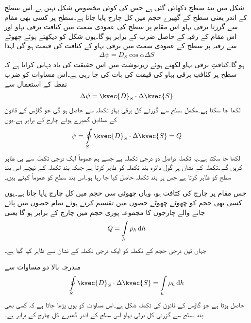شکل  میں  بند سطح دکھائی گئی ہے جس کی کوئی مخصوص شکل نہیں ہے۔اس سطح کے اندر یعنی سطح کے گھیرے حجم میں کل  چارج  پایا جاتا ہے۔سطح پر کسی بھی مقام سے گزرتا برقی بہاو اس مقام پر سطح کی عمودی سمت میں کثافت برقی بہاو اور اس مقام کے رقبہ کے حاصل ضرب کے برابر ہو گا۔یوں شکل کو دیکھتے ہوئے  چھوٹے سے رقبہ  پر سطح کے عمودی سمت میں برقی بہاو کے کثافت  کی قیمت  ہو گی لہٰذا
\begin{align*}
\Delta \psi =D_S \cos \alpha  \Delta S
\end{align*}
ہو گا۔کثافتِ برقی بہاو  لکھتے ہوئے زیرنوشت میں  اس حقیقت کی یاد دہانی کراتا ہے کہ سطح پر کثافتِ برقی بہاو کی قیمت کی بات کی جا رہی ہے۔اس مساوات کو ضرب نقطہ کے استعمال سے
\begin{align*}
\Delta \psi =\kvec{D}_S \cdot \Delta \kvec{S}
\end{align*}
لکھا جا سکتا ہے۔مکمل سطح سے گزرتے کل برقی بہاو تکملہ سے حاصل ہو گی جو گاؤس کے قانون کے مطابق گھیرے ہوئے چارج  کے برابر ہے۔یوں
\begin{align}\label{مساوات_گاوس_قانون_گاوس_بنیادی_شکل}
\psi=\oint\limits_{S} \kvec{D}_S \cdot \Delta \kvec{S}=Q
\end{align}
لکھا جا سکتا ہے۔یہ تکملہ دراصل دو درجی  تکملہ ہے جسے ہم عموماً ایک درجی تکملہ سے ہی ظاہر کریں گے۔تکملہ کے نشان پر گول دائرہ بند تکملہ کو ظاہر کرتا ہے جبکہ بند تکملہ  کے  نیچے  اس بند سطح کو ظاہر کرتا ہے جس پر بند تکملہ حاصل کیا جا رہا ہو۔اس بند سطح کو عموماً  کہتے ہیں۔

جس مقام پر چارج کی کثافت  ہو، وہاں  چھوٹی سی حجم  میں کل چارج   پایا جاتا ہے۔یوں کسی بھی حجم کو چھوٹے چھوٹے حصوں میں تقسیم کرتے ہوئے تمام حصوں میں پائے جانے والے چارجوں کا مجموعہ پوری حجم میں چارج کے برابر ہو گا یعنی
\begin{align}\label{مساوات_گاؤس_کل_حجمی_چارج}
Q=\int\limits_{h} \rho_h \dif h
 \end{align}
جہاں تین درجی حجم کے تکملہ کو ایک درجی تکملہ کے نشان سے ظاہر کیا گیا ہے۔

مندرجہ بالا دو مساوات سے
\begin{align}\label{مساوات_گاؤس_کے_قانون_کی_تکملہ_شکل}
\oint\limits_{S} \kvec{D}_S \cdot \Delta \kvec{S}=\int\limits_{h} \rho_h \dif h
\end{align}
حاصل ہوتا ہے جو گاؤس کے قانون کی تکملہ شکل ہے۔اس مساوات کو یوں پڑھا جاتا ہے کہ کسی بھی بند سطح سے گزرتی کل برقی بہاو اس سطح کے اندر گھیرے کل چارج کے برابر  ہے۔

